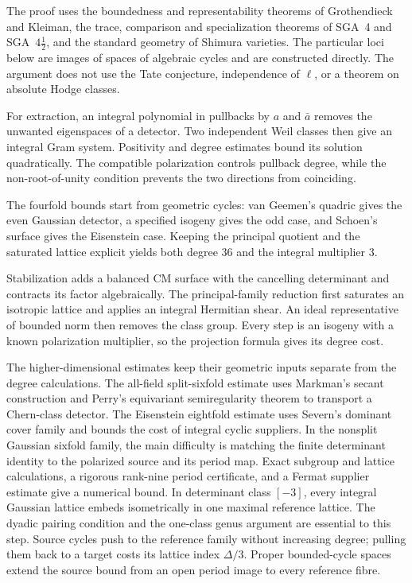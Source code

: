 \documentclass[11pt]{article}
\theoremstyle{definition}
\theoremstyle{remark}
\begin{document}
The proof uses the boundedness and representability theorems of Grothendieck and Kleiman, the trace, comparison and specialization theorems of SGA~4 and SGA~$4\frac12$, and the standard geometry of Shimura varieties. The particular loci below are images of spaces of algebraic cycles and are constructed directly. The argument does not use the Tate conjecture, independence of $\ell$, or a theorem on absolute Hodge classes.


For extraction, an integral polynomial in pullbacks by $a$ and $\bar a$
removes the unwanted eigenspaces of a detector. Two independent Weil
classes then give an integral Gram system. Positivity and degree
estimates bound its solution quadratically. The compatible polarization
controls pullback degree, while the non-root-of-unity condition prevents
the two directions from coinciding.

The fourfold bounds start from geometric cycles: van Geemen's quadric
gives the even Gaussian detector, a specified isogeny gives the odd
case, and Schoen's surface gives the Eisenstein case. Keeping the
principal quotient and the saturated lattice explicit yields both
degree $36$ and the integral multiplier $3$.

Stabilization adds a balanced CM surface with the cancelling determinant
and contracts its factor algebraically. The principal-family reduction
first saturates an isotropic lattice and applies an integral Hermitian
shear. An ideal representative of bounded norm then removes the class
group. Every step is an isogeny with a known polarization multiplier,
so the projection formula gives its degree cost.


The higher-dimensional estimates keep their geometric inputs separate
from the degree calculations. The all-field split-sixfold estimate uses
Markman's secant construction and Perry's equivariant semiregularity
theorem to transport a Chern-class detector. The Eisenstein eightfold
estimate uses Severn's dominant cover family and bounds the cost of
integral cyclic suppliers. In the nonsplit Gaussian sixfold family,
the main difficulty is matching the finite determinant identity to
the polarized source and its period map. Exact subgroup and lattice
calculations, a rigorous rank-nine period certificate, and a Fermat
supplier estimate give a numerical bound.  In determinant class
$[-3]$, every integral Gaussian lattice embeds isometrically in one
maximal reference lattice.  The dyadic pairing condition and the
one-class genus argument are essential to this step.  Source cycles
push to the reference family without increasing degree; pulling them
back to a target costs its lattice index $\Delta/3$.
Proper bounded-cycle spaces extend the source bound from an open
period image to every reference fibre.
\end{document}
